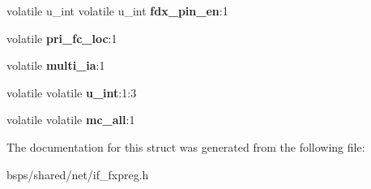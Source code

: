 \begin{DoxyCompactItemize}
\item 
\mbox{\label{structfxp__cb__config_a0a14997c16e1836c18a0a0e3ebe5d7eb}} 
volatile u\+\_\+int volatile u\+\_\+int {\bfseries fdx\+\_\+pin\+\_\+en}\+:1
\item 
\mbox{\label{structfxp__cb__config_a9522ff0d19b350e7ebc19595f9f44997}} 
volatile {\bfseries pri\+\_\+fc\+\_\+loc}\+:1
\item 
\mbox{\label{structfxp__cb__config_a571114725e7bb94c87c51d5c0edf893d}} 
volatile {\bfseries multi\+\_\+ia}\+:1
\item 
\mbox{\label{structfxp__cb__config_a0c91946e071e588409edcf0d55ce5bdc}} 
volatile volatile {\bfseries u\+\_\+int}\+:1\+:3
\item 
\mbox{\label{structfxp__cb__config_ae2018661ad7bb9d444a6cc4338d60475}} 
volatile volatile {\bfseries mc\+\_\+all}\+:1
\end{DoxyCompactItemize}


The documentation for this struct was generated from the following file\+:\begin{DoxyCompactItemize}
\item 
bsps/shared/net/if\+\_\+fxpreg.\+h\end{DoxyCompactItemize}
